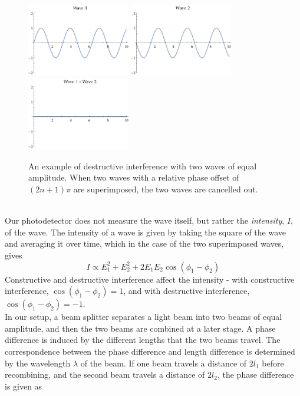   \begin{figure}
    \includegraphics[width=0.4\textwidth]{sin1.pdf}
    \includegraphics[width=0.4\textwidth]{shifted.pdf}
    \includegraphics[width=0.4\textwidth]{destructive.pdf}
    \caption{An example of destructive interference with two waves of equal amplitude. When two waves with a relative phase offset of $(2n+1)\pi$ are superimposed, the two waves are cancelled out.}
    \label{fig:super}
  \end{figure}
  \\
  Our photodetector does not measure the wave itself, but rather the \textit{intensity}, $I$, of the wave. The intensity of a wave is given by taking the square of the wave and averaging it over time, which in the case of the two superimposed waves, gives
  \begin{equation}
    I \propto E_1^2 + E_2^2 + 2E_1 E_2 \cos(\phi_1 - \phi_2)
  \end{equation}
  Constructive and destructive interference affect the intensity - with constructive interference, $\cos(\phi_1 - \phi_2) = 1$, and with destructive interference, $\cos(\phi_1 - \phi_2) = -1$.
  \\
  In our setup, a beam splitter separates a light beam into two beams of equal amplitude, and then the two beams are combined at a later stage. A phase difference is induced by the different lengths that the two beams travel. The correspondence between the phase difference and length difference is determined by the wavelength $\lambda$ of the beam. If one beam travels a distance of $2l_1$ before recombining, and the second beam travels a distance of $2l_2$, the phase difference is given as
